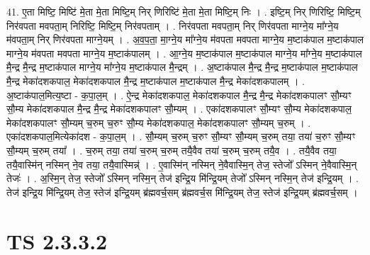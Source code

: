 \documentclass[17pt]{extarticle}
\begin{document}
41. ए॒ता मिष्टि॒ मिष्टि॑ मे॒ता मे॒ता मिष्टि॒म् निर् णिरिष्टि॑ मे॒ता मे॒ता मिष्टि॒म् निः । . इष्टि॒म् निर् णिरिष्टि॒ मिष्टि॒म् निर॑वपता मवपता॒म् निरिष्टि॒ मिष्टि॒म् निर॑वपताम् । . निर॑वपता मवपता॒म् निर् णिर॑वपता माग्ने॒य मा᳚ग्ने॒य म॑वपता॒म् निर् णिर॑वपता माग्ने॒यम् । . अ॒व॒प॒ता॒ मा॒ग्ने॒य मा᳚ग्ने॒य म॑वपता मवपता माग्ने॒य म॒ष्टाक॑पाल म॒ष्टाक॑पाल माग्ने॒य म॑वपता मवपता माग्ने॒य म॒ष्टाक॑पालम् । . आ॒ग्ने॒य म॒ष्टाक॑पाल म॒ष्टाक॑पाल माग्ने॒य मा᳚ग्ने॒य म॒ष्टाक॑पाल मै॒न्द्र मै॒न्द्र म॒ष्टाक॑पाल माग्ने॒य मा᳚ग्ने॒य म॒ष्टाक॑पाल मै॒न्द्रम् । . अ॒ष्टाक॑पाल मै॒न्द्र मै॒न्द्र म॒ष्टाक॑पाल म॒ष्टाक॑पाल मै॒न्द्र मेका॑दशकपाल॒ मेका॑दशकपाल मै॒न्द्र म॒ष्टाक॑पाल म॒ष्टाक॑पाल मै॒न्द्र मेका॑दशकपालम् । . अ॒ष्टाक॑पाल॒मित्य॒ष्टा - क॒पा॒ल॒म् । . ऐ॒न्द्र मेका॑दशकपाल॒ मेका॑दशकपाल मै॒न्द्र मै॒न्द्र मेका॑दशकपालꣳ सौ॒म्यꣳ सौ॒म्य मेका॑दशकपाल मै॒न्द्र मै॒न्द्र मेका॑दशकपालꣳ सौ॒म्यम् । . एका॑दशकपालꣳ सौ॒म्यꣳ सौ॒म्य मेका॑दशकपाल॒ मेका॑दशकपालꣳ सौ॒म्यम् च॒रुम् च॒रुꣳ सौ॒म्य मेका॑दशकपाल॒ मेका॑दशकपालꣳ सौ॒म्यम् च॒रुम् । . एका॑दशकपाल॒मित्येका॑दश - क॒पा॒ल॒म् । . सौ॒म्यम् च॒रुम् च॒रुꣳ सौ॒म्यꣳ सौ॒म्यम् च॒रुम् तया॒ तया॑ च॒रुꣳ सौ॒म्यꣳ सौ॒म्यम् च॒रुम् तया᳚ । . च॒रुम् तया॒ तया॑ च॒रुम् च॒रुम् तयै॒वैव तया॑ च॒रुम् च॒रुम् तयै॒व । . तयै॒वैव तया॒ तयै॒वास्मि॑न् नस्मिन् ने॒व तया॒ तयै॒वास्मिन्न्॑ । . ए॒वास्मि॑न् नस्मिन् ने॒वैवास्मि॒न् तेज॒ स्तेजो᳚ ऽस्मिन् ने॒वैवास्मि॒न् तेजः॑ । . अ॒स्मि॒न् तेज॒ स्तेजो᳚ ऽस्मिन् नस्मि॒न् तेज॑ इन्द्रि॒य मि॑न्द्रि॒यम् तेजो᳚ ऽस्मिन् नस्मि॒न् तेज॑ इन्द्रि॒यम् । . तेज॑ इन्द्रि॒य मि॑न्द्रि॒यम् तेज॒ स्तेज॑ इन्द्रि॒यम् ब्र॑ह्मवर्च॒सम् ब्र॑ह्मवर्च॒स मि॑न्द्रि॒यम् तेज॒ स्तेज॑ इन्द्रि॒यम् ब्र॑ह्मवर्च॒सम् । \newline
\pagebreak
{}

\section{ TS 2.3.3.2 }
\end{document}
